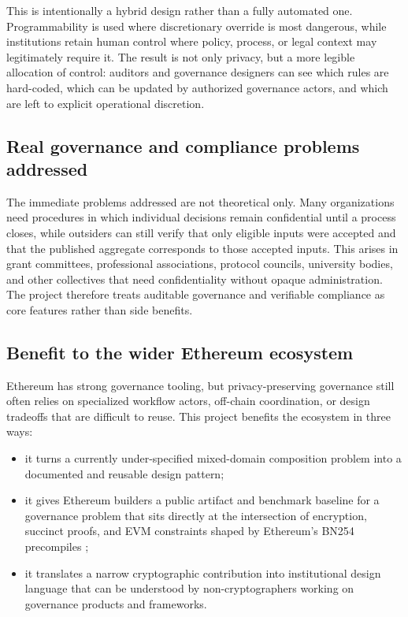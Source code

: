 \documentclass[11pt]{article}
\begin{document}
This is intentionally a hybrid design rather than a fully automated one.
Programmability is used where discretionary override is most dangerous, while
institutions retain human control where policy, process, or legal context may
legitimately require it. The result is not only privacy, but a more legible
allocation of control: auditors and governance designers can see which rules are
hard-coded, which can be updated by authorized governance actors, and which are
left to explicit operational discretion.

\subsection{Real governance and compliance problems addressed}

The immediate problems addressed are not theoretical only. Many organizations
need procedures in which individual decisions remain confidential until a
process closes, while outsiders can still verify that only eligible inputs were
accepted and that the published aggregate corresponds to those accepted inputs.
This arises in grant committees, professional associations, protocol councils,
university bodies, and other collectives that need confidentiality without
opaque administration. The project therefore treats auditable governance and
verifiable compliance as core features rather than side benefits.

\subsection{Benefit to the wider Ethereum ecosystem}

Ethereum has strong governance tooling, but privacy-preserving governance still
often relies on specialized workflow actors, off-chain coordination, or design
tradeoffs that are difficult to reuse. This project benefits the ecosystem in
three ways:

\begin{itemize}[leftmargin=*]
\item it turns a currently under-specified mixed-domain composition problem into
      a documented and reusable design pattern;
\item it gives Ethereum builders a public artifact and benchmark baseline for a
      governance problem that sits directly at the intersection of encryption,
      succinct proofs, and EVM constraints shaped by Ethereum's BN254 precompiles
      \cite{eip196,eip197};
\item it translates a narrow cryptographic contribution into institutional
      design language that can be understood by non-cryptographers working on
      governance products and frameworks.
\end{itemize}
\end{document}
